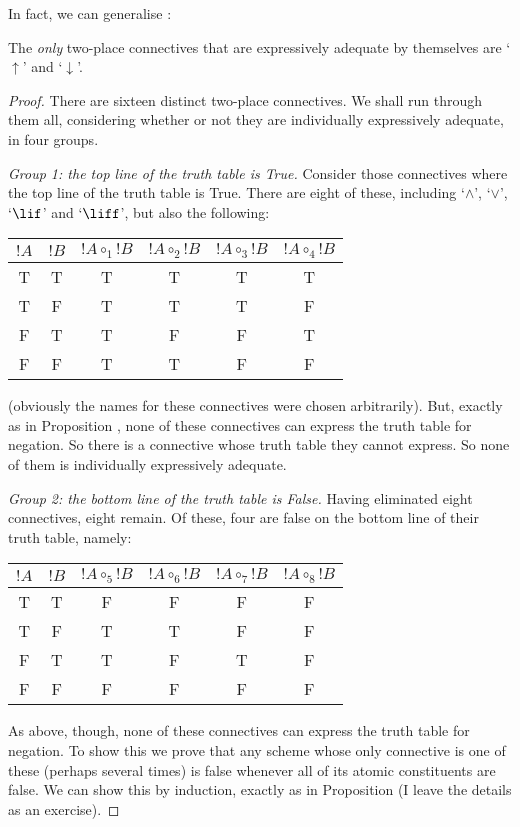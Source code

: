 \documentclass[../../../include/open-logic-section]{subfiles}
\begin{document}
In fact, we can generalise :
	\begin{thm}The \emph{only} two-place connectives that are expressively adequate by themselves are `$\uparrow$' and `$\downarrow$'. 
		\begin{proof}
			There are sixteen distinct two-place connectives. We shall run through them all, considering whether or not they are individually expressively adequate, in four groups. 
			
			\emph{Group 1: the top line of the truth table is True.} Consider those connectives where the top line of the truth table is True. There are eight of  these, including `$\land$', `$\lor$', `$\lif$' and `$\liff$', but also the following:
	\begin{center}
		\begin{tabular}{c c | c c c c}
		${!A}$ & ${!B}$ & ${!A} \mathrel{\circ_1} {!B}$ & ${!A} \mathrel{\circ_2} {!B}$ & ${!A} \mathrel{\circ_3} {!B}$ & ${!A} \mathrel{\circ_4} {!B}$\\
		\hline
			 T & T & T & T & T & T \\
			 T & F & T & T & T & F\\
			 F & T & T & F &  F & T \\
			 F & F & T & T & F & F
	\end{tabular}
	\end{center}
	(obviously the names for these connectives were chosen arbitrarily). But, exactly as in Proposition , none of these connectives can express the truth table for negation. So there is a connective whose truth table they cannot express. So none of them is individually expressively adequate.
				
			\emph{Group 2: the bottom line of the truth table is False.} Having eliminated eight connectives, eight remain. Of these, four are false on the bottom line of their truth table, namely:
	\begin{center}
		\begin{tabular}{c c | c c c c}
		${!A}$ & ${!B}$ & ${!A} \mathrel{\circ_5} {!B}$ & ${!A} \mathrel{\circ_6} {!B}$ & ${!A} \mathrel{\circ_7} {!B}$ & ${!A} \mathrel{\circ_8} {!B}$\\
		\hline
			 T & T & F & F & F & F \\
			 T & F & T & T & F & F\\
			 F & T & T & F &  T & F \\
			 F & F & F & F & F & F
	\end{tabular}
	\end{center}
	As above, though, none of these connectives can express the truth table for negation. To show this we prove that any scheme whose only connective is one of these (perhaps several times) is false whenever all of its atomic constituents are false. We can show this by induction, exactly as in Proposition  (I leave the details as an exercise).
		

\end{proof}
\end{thm}
\end{document}
